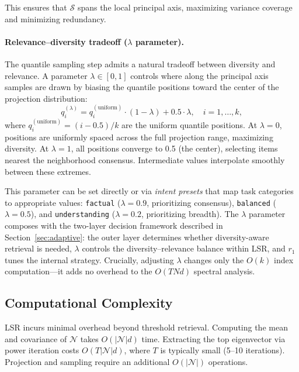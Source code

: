 \documentclass{article}
\begin{document}
This ensures that $\mathcal{S}$ spans the local principal axis, maximizing variance coverage and minimizing redundancy.

\paragraph{Relevance--diversity tradeoff ($\lambda$ parameter).}
The quantile sampling step admits a natural tradeoff between diversity and relevance. A parameter $\lambda \in [0, 1]$ controls where along the principal axis samples are drawn by biasing the quantile positions toward the center of the projection distribution:
\begin{equation}
    q_i^{(\lambda)} = q_i^{(\text{uniform})} \cdot (1 - \lambda) + 0.5 \cdot \lambda, \quad i = 1, \ldots, k,
\end{equation}
where $q_i^{(\text{uniform})} = (i - 0.5)/k$ are the uniform quantile positions. At $\lambda = 0$, positions are uniformly spaced across the full projection range, maximizing diversity. At $\lambda = 1$, all positions converge to 0.5 (the center), selecting items nearest the neighborhood consensus. Intermediate values interpolate smoothly between these extremes.

This parameter can be set directly or via \emph{intent presets} that map task categories to appropriate values: \texttt{factual} ($\lambda = 0.9$, prioritizing consensus), \texttt{balanced} ($\lambda = 0.5$), and \texttt{understanding} ($\lambda = 0.2$, prioritizing breadth). The $\lambda$ parameter composes with the two-layer decision framework described in Section~\ref{sec:adaptive}: the outer layer determines whether diversity-aware retrieval is needed, $\lambda$ controls the diversity--relevance balance within LSR, and $r_1$ tunes the internal strategy. Crucially, adjusting $\lambda$ changes only the $O(k)$ index computation---it adds no overhead to the $O(TNd)$ spectral analysis.

\subsection{Computational Complexity}

LSR incurs minimal overhead beyond threshold retrieval. Computing the mean and covariance of $\mathcal{N}$ takes $O(|\mathcal{N}| d)$ time. Extracting the top eigenvector via power iteration costs $O(T |\mathcal{N}| d)$, where $T$ is typically small (5--10 iterations). Projection and sampling require an additional $O(|\mathcal{N}|)$ operations.
\end{document}
